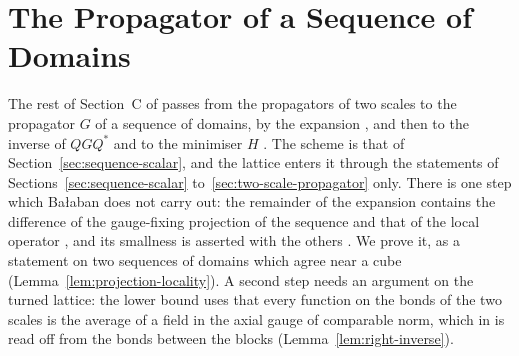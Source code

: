 \documentclass[11pt]{preprint}
\numberwithin{equation}{section}
\theoremstyle{definition}
\theoremstyle{remark}
\theoremstyle{plain}
\begin{document}
\section{The Propagator of a Sequence of Domains}\label{sec:sequence-propagator}

The rest of Section~C of \cite{BalabanPRT2} passes from the propagators of two scales to the propagator $G$ of a sequence of domains, by the expansion \cite[(2.91)--(2.93), (2.141)]{BalabanPRT2}, and then to the inverse of $QGQ^*$ and to the minimiser $H$ \cite[(2.142)--(2.151)]{BalabanPRT2}. The scheme is that of Section~\ref{sec:sequence-scalar}, and the lattice enters it through the statements of Sections~\ref{sec:sequence-scalar} to~\ref{sec:two-scale-propagator} only. There is one step which Ba{\l}aban does not carry out: the remainder of the expansion contains the difference of the gauge-fixing projection of the sequence and that of the local operator \cite[(2.92)]{BalabanPRT2}, and its smallness is asserted with the others \cite[(2.134)]{BalabanPRT2}. We prove it, as a statement on two sequences of domains which agree near a cube (Lemma~\ref{lem:projection-locality}). A second step needs an argument on the turned lattice: the lower bound \cite[(2.147)]{BalabanPRT2} uses that every function on the bonds of the two scales is the average of a field in the axial gauge of comparable norm, which in \cite[(2.146)]{BalabanPRT2} is read off from the bonds between the blocks (Lemma~\ref{lem:right-inverse}).
\end{document}
